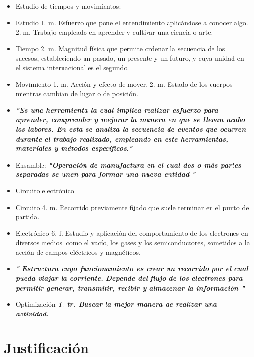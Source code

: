     
    \begin{itemize}
        \item Estudio de tiempos y movimientos:
        \item Estudio
        1. m. Esfuerzo que pone el entendimiento aplicándose a conocer algo.
        2. m. Trabajo empleado en aprender y cultivar una ciencia o arte.
        \item Tiempo
        2. m. Magnitud física que permite ordenar la secuencia de los sucesos, estableciendo un pasado, un presente y un futuro, y cuya unidad en el sistema internacional es el segundo.
        \item Movimiento
        1. m. Acción y efecto de mover.
        2. m. Estado de los cuerpos mientras cambian de lugar o de posición.
        \item \textit{\textbf{ "Es una herramienta la cual implica realizar esfuerzo para aprender, comprender y mejorar la manera en que se llevan acabo las labores. En esta se analiza la secuencia de eventos que ocurren durante el trabajo realizado, empleando en este herramientas, materiales y métodos específicos."}}
        \item Ensamble:
       \textit{\textbf{ "Operación de manufactura en el cual dos o más partes separadas se unen para formar una nueva entidad " }}
       \item  Circuito electrónico 
        \item Circuito
        4. m. Recorrido previamente fijado que suele terminar en el punto de partida.
        \item Electrónico 
        6. f. Estudio y aplicación del comportamiento de los electrones en diversos medios, como el vacío, los gases y los semiconductores, sometidos a la acción de campos eléctricos y magnéticos.
        \item \textit{\textbf{" Estructura cuyo funcionamiento es crear un recorrido por el cual pueda viajar la corriente. Depende del flujo de los electrones para permitir generar, transmitir, recibir  y almacenar la información "}}
       \item  Optimización
        \textit{\textbf{1. tr. Buscar la mejor manera de realizar una actividad.}}
    
    \end{itemize}
    \section{Justificación}
    
